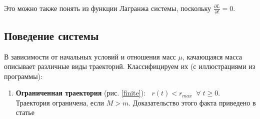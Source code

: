 \documentclass[12pt]{article}
\numberwithin{equation}{section}
\begin{document}
Это можно также понять из функции Лагранжа системы, поскольку $ \frac{\partial L}{\partial t} = 0 $.

\subsection{Поведение системы}

В зависимости от начальных условий и отношения масс $ \mu $, качающаяся масса описывает различные виды траекторий. Классифицируем их (с иллюстрациями из программы):
\clearpage
\begin{enumerate}
	\item \textbf{Ограниченная траектория} (рис. \ref{finite}): $ \;\; r(t)<r_{max}\;\; \forall \;t\geqslant0. $\\ 
	Траектория ограничена, если $ M>m $. Доказательство этого факта приведено в статье \cite{bib1} 
	\vspace{2em}
	\begin{figure}[h]
\end{figure}
\end{enumerate}
\end{document}
